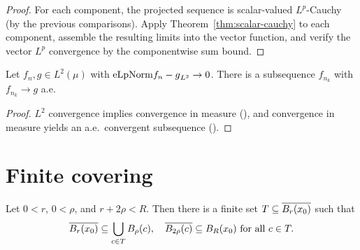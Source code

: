 \begin{proof}
\leanok
{}

For each component, the projected sequence is scalar-valued $L^p$-Cauchy
(by the previous comparisons). Apply Theorem~\ref{thm:scalar-cauchy} to each
component, assemble the resulting limits into the vector function, and
verify the vector $L^p$ convergence by the componentwise sum bound.
\end{proof}

\begin{theorem}
\label{thm:ae-subseq}
\leanok
Let $f_n, g \in L^2(\mu)$ with $\mathrm{eLpNorm}{f_n - g}_{L^2} \to 0$. There is
a subsequence $f_{n_k}$ with $f_{n_k} \to g$ a.e.
\end{theorem}

\begin{proof}
\leanok

$L^2$ convergence implies convergence in measure
(), and convergence in measure
yields an a.e.\ convergent subsequence
().
\end{proof}

\section{Finite covering}

\begin{theorem}
\label{thm:exists_finite_inner_ball_cover}
\leanok
Let $0 < r$, $0 < \rho$, and $r + 2\rho < R$. Then there is a finite set
$T \subseteq \overline{B_{r}(x_0)}$ such that
\begin{equation*}
\overline{B_{r}(x_0)} \subseteq \bigcup_{c \in T} B_{\rho}(c),
\quad
\overline{B_{2\rho}(c)} \subseteq B_{R}(x_0) \text{ for all } c \in T.
\end{equation*}
\end{theorem}

